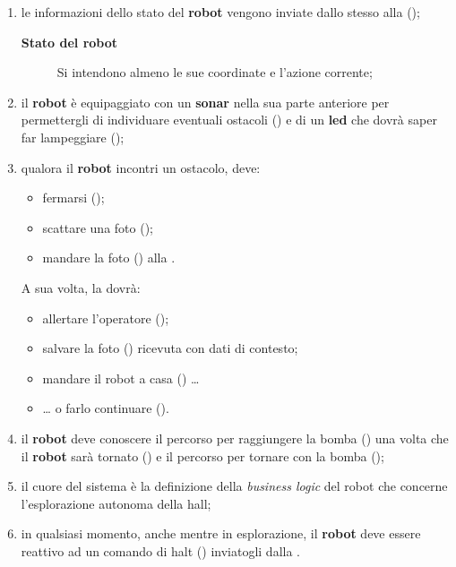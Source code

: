 \begin{enumerate}
  \item
    le informazioni dello stato del \textbf{robot } vengono inviate dallo stesso alla \textbf{} ();
    \begin{description}
      \item[\textbf{Stato del robot}] Si intendono almeno le sue coordinate e l'azione corrente;
    \end{description}

  \item
    il \textbf{robot } è equipaggiato con un \textbf{sonar} nella sua parte anteriore per permettergli di individuare eventuali ostacoli () e di un \textbf{led} che dovrà saper far lampeggiare ();

  \item
    qualora il \textbf{robot } incontri un ostacolo, deve:
    \begin{itemize}
      \item fermarsi ();
      \item scattare una foto ();
      \item mandare la foto () alla \textbf{}.
    \end{itemize}
    A sua volta, la \textbf{} dovrà:
    \begin{itemize}
      \item allertare l'operatore ();
      \item salvare la foto () ricevuta con dati di contesto;
      \item mandare il robot a casa () \ldots{}
      \item \ldots{} o farlo continuare ().
    \end{itemize}

  \item
    il \textbf{robot } deve conoscere il percorso per raggiungere la bomba () una volta che il \textbf{robot } sarà tornato () e il percorso per tornare con la bomba ();

  \item
    il cuore del sistema è la definizione della \textit{business logic} del robot che concerne l'esplorazione autonoma della hall;

  \item
    in qualsiasi momento, anche mentre in esplorazione, il \textbf{robot } deve essere reattivo ad un comando di halt () inviatogli dalla \textbf{}.
\end{enumerate}


